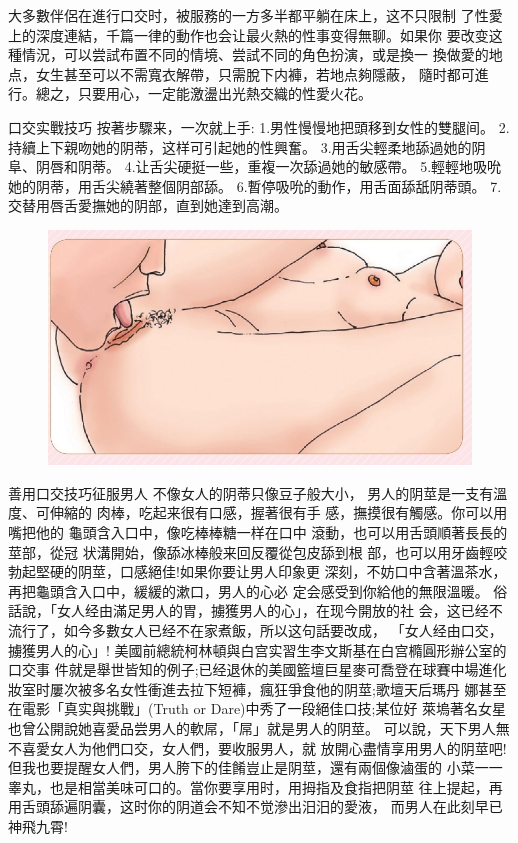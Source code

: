 \documentclass[12pt,UTF8]{ctexbook}
\begin{document}
大多數伴侶在進行口交时，被服務的一方多半都平躺在床上，这不只限制
了性愛上的深度連結，千篇一律的動作也会让最火熱的性事变得無聊。如果你
要改变这種情況，可以尝試布置不同的情境、尝試不同的角色扮演，或是換一
換做愛的地点，女生甚至可以不需寬衣解帶，只需脫下内褲，若地点夠隱蔽，
隨时都可進行。總之，只要用心，一定能激盪出光熱交織的性愛火花。

口交实戰技巧
按著步驟来，一次就上手:
1.男性慢慢地把頭移到女性的雙腿间。
2.持續上下親吻她的阴蒂，这样可引起她的性興奮。
3.用舌尖輕柔地舔過她的阴阜、阴唇和阴蒂。
4.让舌尖硬挺一些，重複一次舔過她的敏感帶。
5.輕輕地吸吮她的阴蒂，用舌尖繞著整個阴部舔。
6.暫停吸吮的動作，用舌面舔舐阴蒂頭。
7.交替用唇舌愛撫她的阴部，直到她達到高潮。

\begin{figure}[htbp]
	\centering
	\includegraphics[width=0.7\linewidth]{19}
	\caption{}
	\label{fig:1}
\end{figure}

善用口交技巧征服男人
不像女人的阴蒂只像豆子般大小，
男人的阴莖是一支有溫度、可伸縮的
肉棒，吃起来很有口感，握著很有手
感，撫摸很有觸感。你可以用嘴把他的
龜頭含入口中，像吃棒棒糖一样在口中
滾動，也可以用舌頭順著長長的莖部，從冠
状溝開始，像舔冰棒般来回反覆從包皮舔到根
部，也可以用牙齒輕咬勃起堅硬的阴莖，口感絕佳!如果你要让男人印象更
深刻，不妨口中含著溫茶水，再把龜頭含入口中，緩緩的漱口，男人的心必
定会感受到你給他的無限溫暖。
俗話說，「女人经由滿足男人的胃，擄獲男人的心」，在现今開放的社
会，这已经不流行了，如今多數女人已经不在家煮飯，所以这句話要改成，
「女人经由口交，擄獲男人的心」!
美國前總統柯林頓與白宫实習生李文斯基在白宫橢圓形辦公室的口交事
件就是舉世皆知的例子;已经退休的美國籃壇巨星麥可喬登在球賽中場進化妝室时屢次被多名女性衝進去拉下短褲，瘋狂爭食他的阴莖;歌壇天后瑪丹
娜甚至在電影「真实與挑戰」(Truth or Dare)中秀了一段絕佳口技;某位好
萊塢著名女星也曾公開說她喜愛品尝男人的軟屌，「屌」就是男人的阴莖。
可以說，天下男人無不喜愛女人为他們口交，女人們，要收服男人，就
放開心盡情享用男人的阴莖吧!
但我也要提醒女人們，男人胯下的佳餚豈止是阴莖，還有兩個像滷蛋的
小菜一一睾丸，也是相當美味可口的。當你要享用时，用拇指及食指把阴莖
往上提起，再用舌頭舔遍阴囊，这时你的阴道会不知不觉滲出汨汨的愛液，
而男人在此刻早已神飛九霄!
\end{document}
